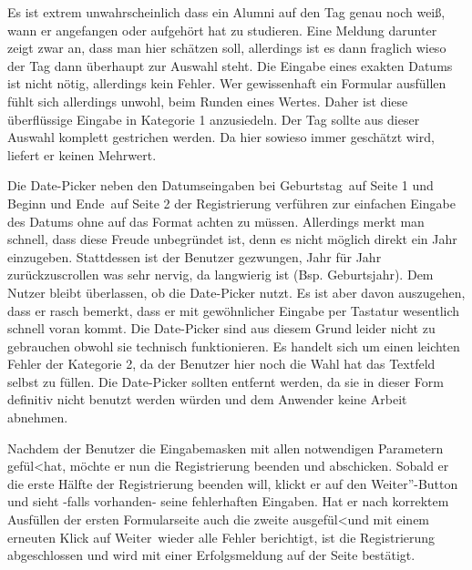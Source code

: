 { Es ist extrem unwahrscheinlich dass ein Alumni auf den Tag genau noch weiß, wann er angefangen oder aufgehört hat zu studieren. 
Eine Meldung darunter zeigt zwar an, dass man hier schätzen soll, allerdings ist es dann fraglich wieso der Tag dann überhaupt zur Auswahl steht.
}
{ Die Eingabe eines exakten Datums ist nicht nötig, allerdings kein Fehler. Wer gewissenhaft ein Formular ausfüllen fühlt sich allerdings unwohl, beim Runden eines
Wertes. Daher ist diese überflüssige Eingabe in Kategorie 1 anzusiedeln.
}
{ Der Tag sollte aus dieser Auswahl komplett gestrichen werden. Da hier sowieso immer geschätzt wird, liefert er keinen Mehrwert.
} 

{ Die Date-Picker neben den Datumseingaben bei \glqq Geburtstag\grqq ~auf Seite 1 und \glqq Beginn und Ende\grqq ~auf Seite 2 der Registrierung verführen zur einfachen Eingabe des Datums ohne auf das Format achten zu müssen. Allerdings merkt man schnell, dass diese Freude unbegründet ist, denn es nicht möglich direkt ein Jahr einzugeben. Stattdessen ist der Benutzer gezwungen, Jahr für Jahr zurückzuscrollen was sehr nervig, da langwierig ist (Bsp. Geburtsjahr).
}
{ Dem Nutzer bleibt überlassen, ob die Date-Picker nutzt. Es ist aber davon auszugehen, dass er rasch bemerkt, dass er mit gewöhnlicher Eingabe per Tastatur wesentlich schnell voran kommt. Die Date-Picker sind aus diesem Grund leider nicht zu gebrauchen obwohl sie technisch funktionieren. Es handelt sich um einen leichten Fehler der Kategorie 2, da der Benutzer hier noch die Wahl hat das Textfeld selbst zu füllen.
}
{ Die Date-Picker sollten entfernt werden, da sie in dieser Form definitiv nicht benutzt werden würden und dem Anwender keine Arbeit abnehmen.
}





Nachdem der Benutzer die Eingabemasken mit allen notwendigen Parametern gefül\textless hat, möchte er nun die Registrierung beenden und abschicken. Sobald
er die erste Hälfte der Registrierung beenden will, klickt er auf den \glqq Weiter”-Button und sieht -falls vorhanden- seine fehlerhaften Eingaben. Hat er nach korrektem
Ausfüllen der ersten Formularseite auch die zweite ausgefül\textless und mit einem erneuten Klick auf \glqq Weiter\grqq ~wieder alle Fehler berichtigt, ist die Registrierung abgeschlossen
und wird mit einer Erfolgsmeldung auf der Seite bestätigt.


